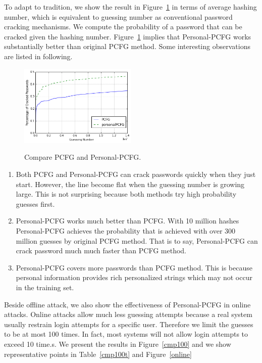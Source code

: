 To adapt to tradition, we show the result in Figure~\ref{f3} in terms of average hashing number, which is equivalent to guessing number as conventional password cracking mechanisms. We compute the probability of a password that can be cracked given the hashing number. Figure~\ref{f3} implies that Personal-PCFG works substantially better than original PCFG method. Some interesting observations are listed in following.

\begin{figure}[h!]
\centering
  \caption{Compare PCFG and Personal-PCFG.}{}
  \label{f3}
  \centering
    \includegraphics[width=0.5\textwidth]{fig/cmp}
\end{figure}

\begin{enumerate}[leftmargin=*]
\item Both PCFG and Personal-PCFG can crack passwords quickly when they just start. However, the line become flat when the guessing number is growing large. This is not surprising because both methods try high probability guesses first. 

\item Personal-PCFG works much better than PCFG. With 10 million hashes Personal-PCFG achieves the probability that is achieved with over 300 million guesses by original PCFG method. That is to say, Personal-PCFG can crack password much much faster than PCFG method. 

\item Personal-PCFG covers more passwords than PCFG method. This is because personal information provides rich personalized strings which may not occur in the training set.

\end{enumerate}

Beside offline attack, we also show the effectiveness of Personal-PCFG in online attacks. Online attacks allow much less guessing attempts because a real system usually restrain login attempts for a specific user. Therefore we limit the guesses to be at most 100 times. In fact, most systems will not allow login attempts to exceed 10 time.s. We present the results in Figure~\ref{cmp100} and we show representative points in Table~\ref{cmp100t} and Figure~\ref{online}


